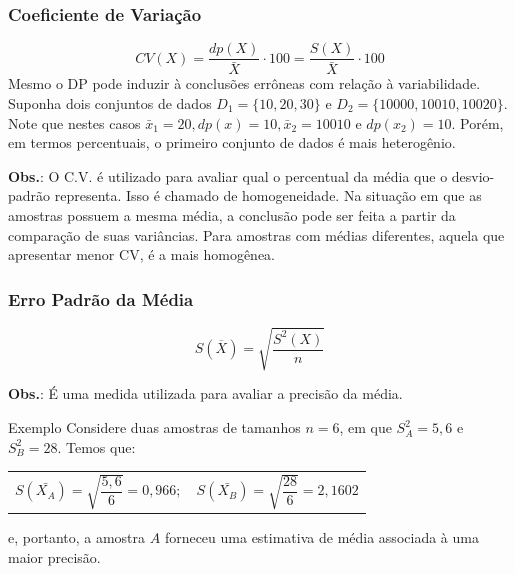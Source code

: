 \documentclass[14pt,aspectratio=1610]{beamer}
\begin{document}
\begin{frame}{}
\frametitle{Coeficiente de Variação}
\begin{block}{}
\justifying
\begin{equation}
CV(X)=\dfrac{dp(X)}{\bar{X}}\cdot 100 = \dfrac{S(X)}{\bar{X}}\cdot 100
\end{equation}
Mesmo o DP pode induzir à conclusões errôneas com relação à variabilidade. Suponha dois conjuntos de dados 
$D_{1}=\{10,20,30\}$ e $D_{2}=\{10000,10010,10020\}.$ Note que nestes casos $\bar{x}_{1}=20, dp(x)=10, 
\bar{x}_{2}=10010$ e $dp(x_{2})=10.$ Porém, em termos percentuais, o primeiro conjunto de dados é mais 
heterogênio.
\end{block}
\pause
\begin{block}{}
\justifying
\noindent \textbf{Obs.}: O C.V. é utilizado para avaliar qual o percentual da média que o desvio-padrão representa. Isso é chamado de homogeneidade. Na situação em que as amostras possuem a mesma média, a conclusão pode ser feita a partir da comparação de suas variâncias. Para amostras com médias diferentes, aquela que apresentar menor CV, é a mais homogênea.
\end{block}
\end{frame}

\begin{frame}{}
    \frametitle{Erro Padrão da Média}
    \begin{block}{}
    \begin{equation*}
	S(\overline{X}) = \sqrt{ \dfrac{S^2(X)}{n} }
	\end{equation*}
	
	\noindent \textbf{Obs.}: É uma medida utilizada para avaliar a precisão da média. 
    \end{block}
    \pause
    \begin{block}{Exemplo}
    Considere duas amostras de tamanhos $n=6$, em que $S^{2}_{A}
= 5,6$ e $S^{2}_{B}= 28.$ Temos que:

\begin{table}[H]
    \centering
    \begin{tabular}{cc}
    $S(\bar{X_{A}})=\sqrt{\dfrac{5,6}{6}}=0,966;$     &  
    $S(\bar{X_{B}})=\sqrt{\dfrac{28}{6}}=2,1602$
    \end{tabular}
\end{table}
e, portanto, a amostra $A$ forneceu uma estimativa de média associada à uma maior precisão. 
    \end{block}
\end{frame}
\end{document}
